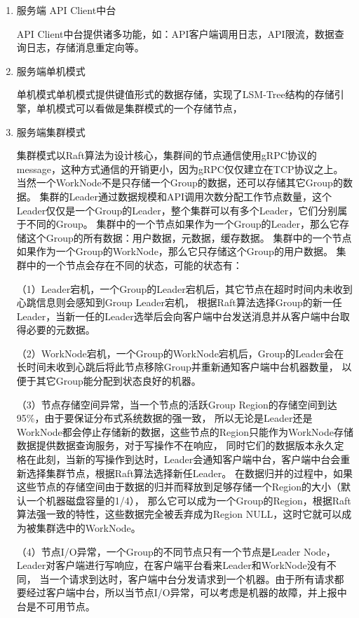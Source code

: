 		\begin{enumerate}[fullwidth,itemindent=2em,listparindent=2em]
			\item 服务端 API Client中台
			
			API Client中台提供诸多功能，如：API客户端调用日志，API限流，数据查询日志，存储消息重定向等。

			\item 服务端单机模式
			
			单机模式单机模式提供键值形式的数据存储，实现了LSM-Tree结构的存储引擎，单机模式可以看做是集群模式的一个存储节点，
			
			\item 服务端集群模式
			
			集群模式以Raft算法为设计核心，集群间的节点通信使用gRPC协议的message，这种方式通信的开销更小，因为gRPC仅仅建立在TCP协议之上。
			当然一个WorkNode不是只存储一个Group的数据，还可以存储其它Group的数据。
			集群的Leader通过数据规模和API调用次数分配工作节点数量，这个Leader仅仅是一个Group的Leader，整个集群可以有多个Leader，它们分别属于不同的Group。
			集群中的一个节点如果作为一个Group的Leader，那么它存储这个Group的所有数据：用户数据，元数据，缓存数据。
			集群中的一个节点如果作为一个Group的WorkNode，那么它只存储这个Group的用户数据。
			集群中的一个节点会存在不同的状态，可能的状态有：
	
			（1）Leader宕机，一个Group的Leader宕机后，其它节点在超时时间内未收到心跳信息则会感知到Group Leader宕机，
			根据Raft算法选择Group的新一任Leader，当新一任的Leader选举后会向客户端中台发送消息并从客户端中台取得必要的元数据。
			
			（2）WorkNode宕机，一个Group的WorkNode宕机后，Group的Leader会在长时间未收到心跳后将此节点移除Group并重新通知客户端中台机器数量，
			以便于其它Group能分配到状态良好的机器。
			
			（3）节点存储空间异常，当一个节点的活跃Group Region的存储空间到达95\%，由于要保证分布式系统数据的强一致，
			所以无论是Leader还是WorkNode都会停止存储新的数据，这些节点的Region只能作为WorkNode存储数据提供数据查询服务，对于写操作不在响应，
			同时它们的数据版本永久定格在此刻，当新的写操作到达时，Leader会通知客户端中台，客户端中台会重新选择集群节点，根据Raft算法选择新任Leader。
			在数据归并的过程中，如果这些节点的存储空间由于数据的归并而释放到足够存储一个Region的大小（默认一个机器磁盘容量的1/4），
			那么它可以成为一个Group的Region，根据Raft算法强一致的特性，这些数据完全被丢弃成为Region NULL，这时它就可以成为被集群选中的WorkNode。
	
			（4）节点I/O异常，一个Group的不同节点只有一个节点是Leader Node，Leader对客户端进行写响应，在客户端平台看来Leader和WorkNode没有不同，
			当一个请求到达时，客户端中台分发请求到一个机器。由于所有请求都要经过客户端中台，所以当节点I/O异常，可以考虑是机器的故障，并上报中台是不可用节点。
	

\end{enumerate}
